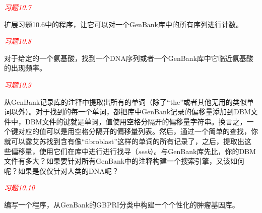 \textcolor{red}{\textit{习题10.7}}
\begin{adjustwidth}{1cm}{}
扩展习题10.6中的程序，让它可以对一个GenBank库中的所有序列进行计数。
\end{adjustwidth}

\textcolor{red}{\textit{习题10.8}}
\begin{adjustwidth}{1cm}{}
对于给定的一个氨基酸，找到一个DNA序列或者一个GenBank库中它临近氨基酸的出现频率。
\end{adjustwidth}

\textcolor{red}{\textit{习题10.9}}
\begin{adjustwidth}{1cm}{}
  从GenBank记录库的注释中提取出所有的单词（除了“the”或者其他无用的类似单词以外）。对于找到的每一个单词，都把库中GenBank记录的偏移量添加到DBM文件中，DBM文件的键就是单词，值使用空格分隔开的偏移量字符串。换言之，一个键对应的值可以是用空格分隔开的偏移量列表。然后，通过一个简单的查找，你就可以露艾苏找到含有像“fibroblast”这样的单词的所有记录了，之后，提取出这些偏移量，使用它们在库中进行进行找寻（\textit{seek}）。与GenBank库先比，你的DBM文件有多大？如果要针对所有GenBank中的注释构建一个搜索引擎，又该如何呢？如果是仅仅针对人类的DNA呢？
\end{adjustwidth}

\textcolor{red}{\textit{习题10.10}}
\begin{adjustwidth}{1cm}{}
编写一个程序，从GenBank的GBPRI分类中构建一个个性化的肿瘤基因库。
\end{adjustwidth}

